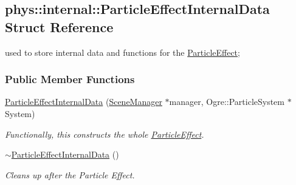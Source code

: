 \hypertarget{structphys_1_1internal_1_1ParticleEffectInternalData}{
\subsection{phys::internal::ParticleEffectInternalData Struct Reference}
\label{d6/d85/structphys_1_1internal_1_1ParticleEffectInternalData}
}


used to store internal data and functions for the \hyperlink{classphys_1_1ParticleEffect}{ParticleEffect};  


\subsubsection*{Public Member Functions}
\begin{DoxyCompactItemize}
\item 
\hypertarget{structphys_1_1internal_1_1ParticleEffectInternalData_aa2020347e2755e1476c11f3bc190af57}{
\hyperlink{structphys_1_1internal_1_1ParticleEffectInternalData_aa2020347e2755e1476c11f3bc190af57}{ParticleEffectInternalData} (\hyperlink{classphys_1_1SceneManager}{SceneManager} $\ast$manager, Ogre::ParticleSystem $\ast$System)}
\label{d6/d85/structphys_1_1internal_1_1ParticleEffectInternalData_aa2020347e2755e1476c11f3bc190af57}

\begin{DoxyCompactList}\small\item\em Functionally, this constructs the whole \hyperlink{classphys_1_1ParticleEffect}{ParticleEffect}. \item\end{DoxyCompactList}\item 
\hypertarget{structphys_1_1internal_1_1ParticleEffectInternalData_a42dbfeea2d498ef1b023cebe4e5d4257}{
\hyperlink{structphys_1_1internal_1_1ParticleEffectInternalData_a42dbfeea2d498ef1b023cebe4e5d4257}{$\sim$ParticleEffectInternalData} ()}
\label{d6/d85/structphys_1_1internal_1_1ParticleEffectInternalData_a42dbfeea2d498ef1b023cebe4e5d4257}

\begin{DoxyCompactList}\small\item\em Cleans up after the Particle Effect. \item\end{DoxyCompactList}\end{DoxyCompactItemize}
